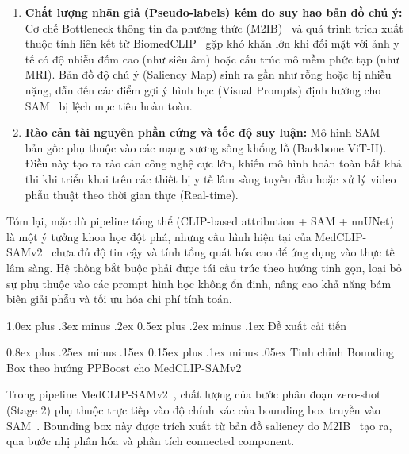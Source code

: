 \documentclass[conference]{IEEEtran}
\makeatletter
\def\section{\@startsection{section}{1}{\z@}%
  {1.0ex plus .3ex minus .2ex}%
  {0.5ex plus .2ex minus .1ex}%
  {\reset@font\normalsize\bfseries\centering}}%
\def\subsection{\@startsection{subsection}{2}{\z@}%
  {0.8ex plus .25ex minus .15ex}%
  {0.15ex plus .1ex minus .05ex}%
  {\reset@font\normalsize\itshape}}%
\makeatother
\begin{document}
\begin{enumerate}
    \item \textbf{Chất lượng nhãn giả (Pseudo-labels) kém do suy hao bản đồ chú ý:} Cơ chế Bottleneck thông tin đa phương thức (M2IB)~\cite{ref7} và quá trình trích xuất thuộc tính liên kết từ BiomedCLIP~\cite{ref3} gặp khó khăn lớn khi đối mặt với ảnh y tế có độ nhiễu đốm cao (như siêu âm) hoặc cấu trúc mô mềm phức tạp (như MRI). Bản đồ độ chú ý (Saliency Map) sinh ra gần như rỗng hoặc bị nhiễu nặng, dẫn đến các điểm gợi ý hình học (Visual Prompts) định hướng cho SAM~\cite{ref2,ref4} bị lệch mục tiêu hoàn toàn.
    \item \textbf{Rào cản tài nguyên phần cứng và tốc độ suy luận:} Mô hình SAM~\cite{ref2,ref4} bản gốc phụ thuộc vào các mạng xương sống khổng lồ (Backbone ViT-H). Điều này tạo ra rào cản công nghệ cực lớn, khiến mô hình hoàn toàn bất khả thi khi triển khai trên các thiết bị y tế lâm sàng tuyến đầu hoặc xử lý video phẫu thuật theo thời gian thực (Real-time).
\end{enumerate}

Tóm lại, mặc dù pipeline tổng thể (CLIP-based attribution + SAM + nnUNet) là một ý tưởng khoa học đột phá, nhưng cấu hình hiện tại của MedCLIP-SAMv2~\cite{ref1} chưa đủ độ tin cậy và tính tổng quát hóa cao để ứng dụng vào thực tế lâm sàng. Hệ thống bắt buộc phải được tái cấu trúc theo hướng tinh gọn, loại bỏ sự phụ thuộc vào các prompt hình học không ổn định, nâng cao khả năng bám biên giải phẫu và tối ưu hóa chi phí tính toán.

\section{Đề xuất cải tiến}
\label{sec:dexuat}

\subsection{Tinh chỉnh Bounding Box theo hướng PPBoost cho MedCLIP-SAMv2}

Trong pipeline MedCLIP-SAMv2~\cite{ref1}, chất lượng của bước phân đoạn zero-shot (Stage 2) phụ thuộc trực tiếp vào độ chính xác của bounding box truyền vào SAM~\cite{ref2,ref4}. Bounding box này được trích xuất từ bản đồ saliency do M2IB~\cite{ref7} tạo ra, qua bước nhị phân hóa và phân tích connected component.
\end{document}
